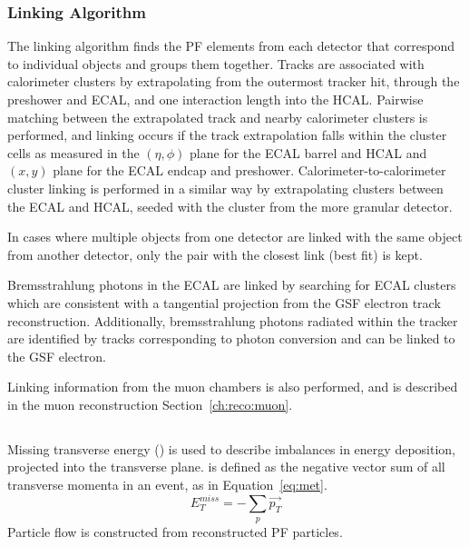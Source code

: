 \subsubsection{Linking Algorithm}
The linking algorithm finds the PF elements from each detector that correspond to individual objects and groups them together. Tracks are associated with calorimeter clusters by extrapolating from the outermost tracker hit, through the preshower and ECAL, and one interaction length into the HCAL. Pairwise matching between the extrapolated track and nearby calorimeter clusters is performed, and linking occurs if the track extrapolation falls within the cluster cells as measured in the $(\eta,\phi)$ plane for the ECAL barrel and HCAL and $(x,y)$ plane for the ECAL endcap and preshower. Calorimeter-to-calorimeter cluster linking is performed in a similar way by extrapolating clusters between the ECAL and HCAL, seeded with the cluster from the more granular detector. 

In cases where multiple objects from one detector are linked with the same object from another detector, only the pair with the closest link (best fit) is kept. 

Bremsstrahlung photons in the ECAL are linked by searching for ECAL clusters which are consistent with a tangential projection from the GSF electron track reconstruction. Additionally, bremsstrahlung photons radiated within the tracker are identified by tracks corresponding to photon conversion and can be linked to the GSF electron. 

Linking information from the muon chambers is also performed, and is described in the muon reconstruction Section~\ref{ch:reco:muon}.


\subsection{\met}
Missing transverse energy (\met) is used to describe imbalances in energy deposition, projected into the transverse plane. \met is defined as the negative vector sum of all transverse momenta in an event, as in Equation~\ref{eq:met}.
\begin{equation}
    E_T^{miss}=-\sum_{p} \vec{p_T}
    \label{eq:met}
\end{equation}
Particle flow \met is constructed from reconstructed PF particles.



